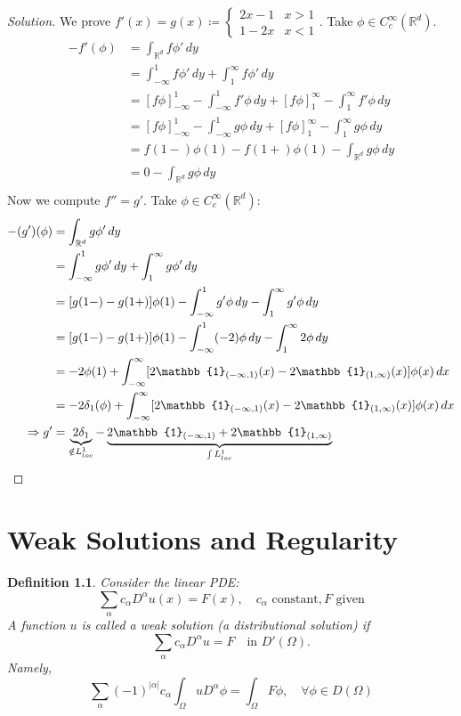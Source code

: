 \documentclass{report}
\theoremstyle{tommy}
\newtheorem{defn}{Definition}
\begin{document}
  \begin{proof}[Solution]
    We prove \(f'(x) = g(x) \coloneqq \begin{cases}
      2x - 1 & x > 1 \\  1- 2x & x < 1
    \end{cases}\). Take \(\phi \in C_c^\infty(\mathbb{R}^d)\).
    \begin{align*}
      -f'(\phi) 
      &= \int_{\mathbb{R}^d} f \phi' \, dy \\
      &=  \int_{-\infty}^1 f \phi' \, dy + \int_1^\infty f \phi' \, dy  \\
      &= [f \phi]_{- \infty}^1 - \int_{- \infty}^1 f' \phi \, dy + [f \phi]_1^\infty - \int_1^\infty f' \phi \, dy \\
      &= [f \phi]_{- \infty}^1 - \int_{- \infty}^1 g \phi \, dy + [f \phi]_1^\infty - \int_1^\infty g \phi \, dy \\
      &= f(1-) \phi(1) - f(1+)\phi(1) - \int_{\mathbb{R}^d} g \phi \, dy \\
      &= 0  - \int_{\mathbb{R}^d} g \phi \, dy \\
    \end{align*}
    Now we compute \(f'' = g'\). Take \(\phi \in C_c^\infty(\mathbb{R}^d)\):
    \begin{align*}
      -(g')(\phi) 
      &= \int_{\mathbb{R}^d} g\phi' \, dy \\
      &= \int_{- \infty}^1  g\phi' \, dy + \int_1^\infty  g\phi' \, dy \\
      &= [g(1-) - g(1+)] \phi(1) - \int_{-\infty}^1g' \phi \, dy - \int_1^\infty g' \phi \, dy \\
      &= [g(1-) - g(1+)] \phi(1) - \int_{-\infty}^1(-2) \phi \, dy - \int_1^\infty 2 \phi \, dy \\
      &= - 2 \phi(1) + \int_{-\infty}^\infty [2 \mathbb{1}_{(-\infty, 1)}(x) - 2 \mathbb{1}_{(1,  \infty)} (x)]\phi(x) \, dx \\
      &= -2 \delta_1(\phi) + \int_{-\infty}^\infty [2 \mathbb{1}_{(-\infty, 1)}(x) - 2 \mathbb{1}_{(1,  \infty)} (x)]\phi(x) \, dx \\
      \Rightarrow g' &= \underbrace{2 \delta_1}_{\notin L_{loc}^1} - \underbrace{2 \mathbb{1}_{(-\infty, 1)} + 2 \mathbb{1}_{(1, \infty)}}_{\int L_{loc}^1} \qedhere
    \end{align*}
  \end{proof}

  \chapter{Weak Solutions and Regularity}
  \begin{defn}
    Consider the linear PDE:
    \[\sum_{\alpha} c_\alpha D^\alpha u(x) = F(x), \quad c_\alpha \text{ constant}, F \text{ given}\]
    A function \(u\) is called a weak solution (a distributional solution) if 
    \[\sum_\alpha c_\alpha D^\alpha u = F \quad \text{in } D'(\Omega).\]
    Namely,
    \[\sum_\alpha (-1)^{|\alpha|} c_\alpha \int_\Omega u D^\alpha \phi = \int_\Omega F \phi, \quad \forall \phi \in D(\Omega)\]
  \end{defn}
\end{document}

